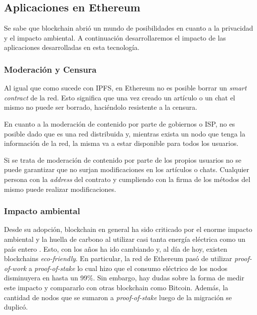 \subsection{Aplicaciones en Ethereum}

Se sabe que blockchain abrió un mundo de posibilidades en cuanto a la privacidad y el impacto ambiental. A continuación desarrollaremos el impacto de las aplicaciones desarrolladas en esta tecnología.

\subsubsection{Moderación y Censura}

Al igual que como sucede con IPFS, en Ethereum no es posible borrar un \textit{smart contract} de la red. Esto significa que una vez creado un artículo o un chat el mismo no puede ser borrado, haciéndolo resistente a la censura.

En cuanto a la moderación de contenido por parte de gobiernos o ISP, no es posible dado que es una red distribuida y, mientras exista un nodo que tenga la información de la red, la misma va a estar disponible para todos los usuarios.

Si se trata de moderación de contenido por parte de los propios usuarios no se puede garantizar que no surjan modificaciones en los artículos o chats. Cualquier persona con la \textit{address} del contrato y cumpliendo con la firma de los métodos del mismo puede realizar modificaciones.

\subsubsection{Impacto ambiental}

Desde su adopción, blockchain en general ha sido criticado por el enorme impacto ambiental y la huella de carbono al utilizar casi tanta energía eléctrica como un país entero \cite{ethereum-honduras}. Esto, con los años ha ido cambiando y, al día de hoy, existen blockchains \textit{eco-friendly}\cite{blockchain-eco-friendly}. En particular, la red de Ethereum pasó de utilizar \textit{proof-of-work} a \textit{proof-of-stake} lo cual hizo que el consumo eléctrico de los nodos disminuyera en hasta un 99\%\cite{ethereum-green}. Sin embargo, hay dudas sobre la forma de medir este impacto y compararlo con otras blockchain como Bitcoin. Además, la cantidad de nodos que se sumaron a \textit{proof-of-stake} luego de la migración se duplicó.\cite{ethereum-pos}
